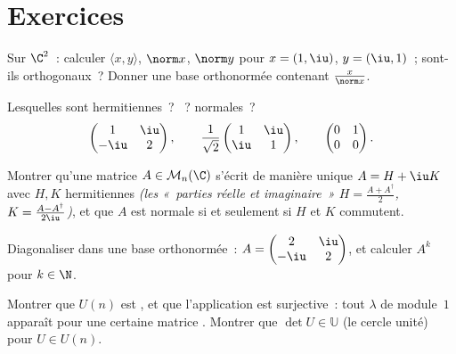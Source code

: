 \section{Exercices}

\begin{exercise}[$\star$]\label{exo:b2:hermitian:1}
Sur $\C^2$~: calculer $\langle x, y\rangle$, $\norm x$, $\norm y$ pour
$x = (1, \iu)$, $y = (\iu, 1)$~; sont-ils orthogonaux~? Donner une
base orthonormée contenant $\frac{x}{\norm x}$.
\end{exercise}

\begin{exercise}[$\star$]\label{exo:b2:hermitian:2}
Lesquelles sont hermitiennes~? ~? normales~?
\[
\begin{pmatrix} 1 & \iu\\ -\iu & 2 \end{pmatrix},
\qquad
\frac{1}{\sqrt2}\begin{pmatrix} 1 & \iu\\ \iu & 1\end{pmatrix},
\qquad
\begin{pmatrix} 0 & 1\\ 0 & 0 \end{pmatrix}.
\]
\end{exercise}

\begin{exercise}[$\star$]\label{exo:b2:hermitian:3}
Montrer qu'une matrice $A \in \mathcal{M}_n(\C)$ s'écrit de manière
unique $A = H + \iu K$ avec $H, K$ hermitiennes \emph{(les «~parties
réelle et imaginaire~» $H = \frac{A + A^\dagger}{2}$, $K = \frac{A -
A^\dagger}{2\iu}$)}, et que $A$ est normale si et seulement si $H$ et
$K$ commutent.
\end{exercise}

\begin{exercise}[$\star\star$]\label{exo:b2:hermitian:4}
Diagonaliser dans une base orthonormée~: $A = \begin{pmatrix} 2 & \iu\\
-\iu & 2\end{pmatrix}$, et calculer $A^k$ pour $k \in \N$.
\end{exercise}

\begin{exercise}[$\star\star$]\label{exo:b2:hermitian:5}
Montrer que $U(n)$ est , et que l'application  est
surjective~: tout $\lambda$ de module~$1$ apparaît pour une certaine
matrice . Montrer que $\det U \in \mathbb{U}$ (le cercle
unité) pour $U \in U(n)$.
\end{exercise}

